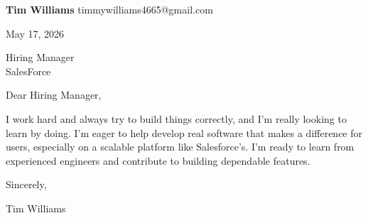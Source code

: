 \documentclass[12pt]{article}
\begin{document}
\textbf{Tim Williams} \hfill timmywilliams4665@gmail.com

\vspace{1em}

May 17, 2026

\vspace{1em}

Hiring Manager \\
SalesForce

\vspace{1em}

Dear Hiring Manager,

I work hard and always try to build things correctly, and I'm really looking to learn by doing. I'm eager to help develop real software that makes a difference for users, especially on a scalable platform like Salesforce's. I'm ready to learn from experienced engineers and contribute to building dependable features.

\vspace{1em}

Sincerely,

\vspace{2em}

Tim Williams
\end{document}
